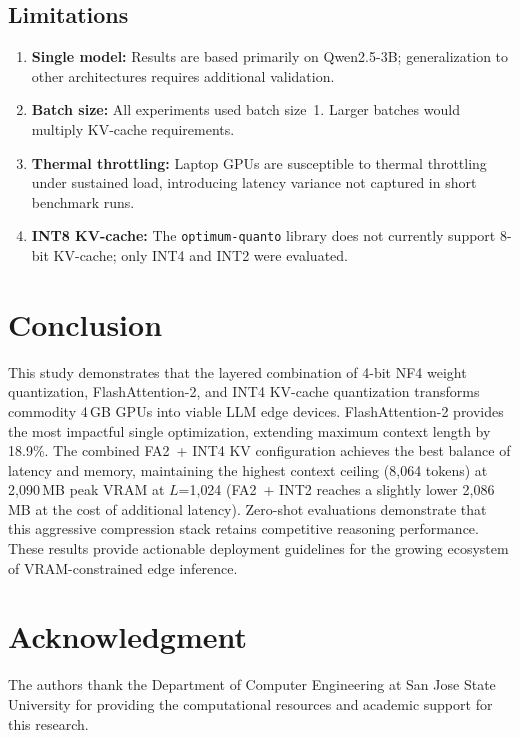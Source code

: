 \documentclass[conference]{IEEEtran}
\begin{document}
\subsection{Limitations}
\begin{enumerate}
    \item \textbf{Single model:} Results are based primarily on Qwen2.5-3B; generalization to other architectures requires additional validation.
    \item \textbf{Batch size:} All experiments used batch size~1. Larger batches would multiply KV-cache requirements.
    \item \textbf{Thermal throttling:} Laptop GPUs are susceptible to thermal throttling under sustained load, introducing latency variance not captured in short benchmark runs.
    \item \textbf{INT8 KV-cache:} The \texttt{optimum-quanto} library does not currently support 8-bit KV-cache; only INT4 and INT2 were evaluated.
\end{enumerate}

\section{Conclusion}
\label{sec:conclusion}

This study demonstrates that the layered combination of 4-bit NF4 weight quantization, FlashAttention-2, and INT4 KV-cache quantization transforms commodity 4\,GB GPUs into viable LLM edge devices. FlashAttention-2 provides the most impactful single optimization, extending maximum context length by 18.9\%. The combined FA2~+ INT4 KV configuration achieves the best balance of latency and memory, maintaining the highest context ceiling (8{,}064 tokens) at 2{,}090\,MB peak VRAM at $L$=1{,}024 (FA2~+ INT2 reaches a slightly lower 2{,}086\,MB at the cost of additional latency). Zero-shot evaluations demonstrate that this aggressive compression stack retains competitive reasoning performance. These results provide actionable deployment guidelines for the growing ecosystem of VRAM-constrained edge inference.

\section*{Acknowledgment}
The authors thank the Department of Computer Engineering at San Jose State University for providing the computational resources and academic support for this research.
\end{document}
